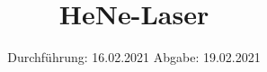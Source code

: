 

\subject{Nr. 61}
\title{HeNe-Laser}
\date{%
  Durchführung: 16.02.2021
  \hspace{3em}
  Abgabe: 19.02.2021
}



\maketitle
\thispagestyle{empty}
\tableofcontents
\newpage






\printbibliography{}


